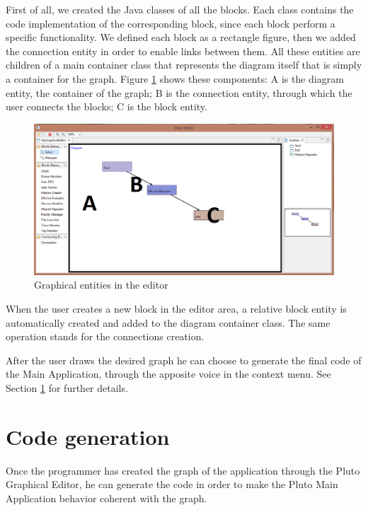 First of all, we created the Java classes of all the blocks.
Each class contains the code implementation of the corresponding block, since each block perform a specific functionality.
We defined each block as a rectangle figure, then we added the connection entity in order to enable links between them.
All these entities are children of a main container class that represents the diagram itself that is simply a container for the graph.
Figure \ref{fig:editorExplanation} shows these components: A is the diagram entity, the container of the graph; B is the connection entity, through which the user connects the blocks; C is the block entity. 
\\

\newpage

\begin{figure}[h!]
\includegraphics[width=\linewidth]
{pictures/editorExplanation.png}
\caption{Graphical entities in the editor}
\label{fig:editorExplanation}
\end{figure}

When the user creates a new  block in the editor area, a relative block entity is automatically created and added to the diagram container class. The same operation stands for the connections creation.

After the user draws the desired graph he can choose to generate the final code of the Main Application, through the apposite voice in the context menu.
See Section \ref{codeGeneration} for further details.
\\

\section{Code generation}\label{codeGeneration}

Once the programmer has created the graph of the application through the Pluto Graphical Editor, he can generate the code in order to make the Pluto Main Application behavior coherent with the graph.

